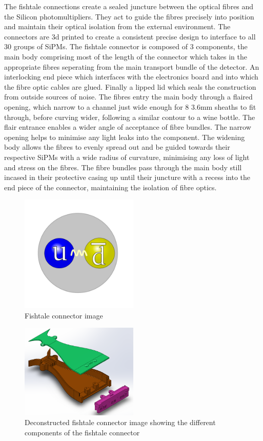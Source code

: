 The fishtale connections create a sealed juncture between the optical fibres and the Silicon photomultipliers. They act to guide the fibres precisely into position and maintain their optical isolation from the external environment. The connectors are 3d printed to create a consistent precise design to interface to all 30 groups of SiPMs. The fishtale connector is composed of 3 components, the main body comprising most of the length of the connector which takes in the appropriate fibres seperating from the main transport bundle of the detector. An interlocking end piece which interfaces with the electronics board and into which the fibre optic cables are glued. Finally a lipped lid which seals the construction from outside sources of noise. The fibres entry the main body through a flaired opening, which narrow to a channel just wide enough for 8 3.6mm sheaths to fit through, before curving wider, following a similar contour to a wine bottle. The flair entrance enables a wider angle of acceptance of fibre bundles. The narrow opening helps to minimise any light leaks into the component. The widening body allows the fibres to evenly spread out and be guided towards their respective SiPMs with a wide radius of curvature, minimising any loss of light and stress on the fibres. The fibre bundles pass through the main body still incased in their protective casing up until their juncture with a recess into the end piece of the connector, maintaining the isolation of fibre optics. 

\begin{figure}[!ht]
	\centering
	\includegraphics[width=0.5\textwidth]{ImgChap1/Meson2}
	\caption{Fishtale connector image}
	\label{FishtaleComplete}
\end{figure}

\begin{figure}[!ht]
	\centering
	\includegraphics[width=0.5\textwidth]{ImgChap1/fishtail}
	\caption{Deconstructed fishtale connector image showing the different components of the fishtale connector}
	\label{FishtaleDeconstructed}
\end{figure}


